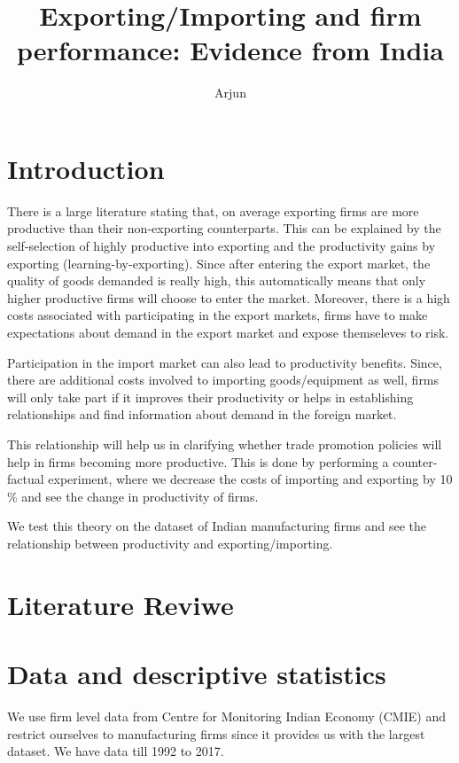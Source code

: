 \documentclass[11pt]{article}
\title{Exporting/Importing and firm performance: Evidence from India}
\author{Arjun }
\begin{document}
\maketitle


\begin{abstract}
 
\end{abstract}


\newpage
\small

\tableofcontents

\newpage
\section{Introduction}\label{sec:introduction}


There is a large literature stating that, on average exporting firms
are more productive than their non-exporting counterparts. This can be
explained by the self-selection of highly productive into exporting
and the productivity gains by exporting
(learning-by-exporting). Since after entering the export market, the quality
of goods demanded is really high, this automatically means that only
higher productive firms will choose to enter the market. Moreover,
there is a high costs associated with participating in the export
markets,  firms have to make expectations about demand in the export
market and expose themseleves to risk.

Participation in the import market can also lead to productivity
benefits. Since, there are additional costs involved to importing
goods/equipment as well, firms will only take part if it improves
their productivity or helps in establishing relationships and find
information about demand in the foreign market. 

This relationship will help us in clarifying whether trade promotion
policies will help in firms becoming more productive. This is done by
performing a counter-factual experiment, where we decrease the costs
of importing and exporting by 10 \% and see the change in productivity
of firms.  

We test this theory on the dataset of Indian manufacturing firms and
see the relationship between productivity and exporting/importing.   

\section{Literature Reviwe}\label{sec:litrev}


\section{Data and descriptive statistics}\label{sec:data}
We use firm level data from Centre for Monitoring Indian Economy
(CMIE) and restrict ourselves to manufacturing firms since it provides
us with the largest dataset. We have data till 1992 to 2017. 
\end{document}
